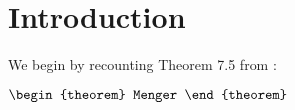 \chapter{Introduction}

We begin by recounting Theorem 7.5 from \cite{gt15}:

\(
\begin{theorem}
Menger
\end{theorem}
\)